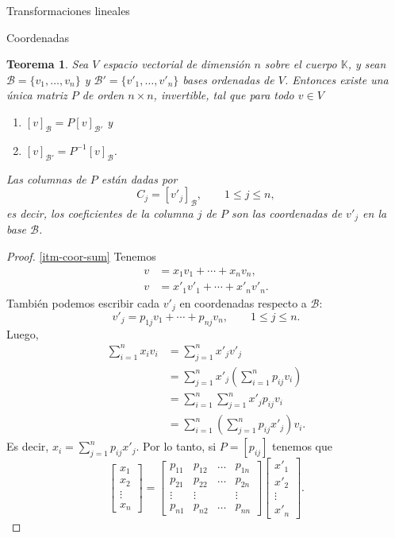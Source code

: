 \documentclass[a4paper,12pt,twoside,spanish,reqno]{amsbook}
\numberwithin{equation}{section}
\newtheorem{teorema}{Teorema}[section]
\theoremstyle{definition}
\theoremstyle{remark}
\newcommand{\K}{\mathbb K}
\begin{document}
\begin{chapter}{Transformaciones lineales}
\begin{section}{Coordenadas}
    \begin{teorema}
            Sea $V$  espacio vectorial de dimensión $n$  sobre el cuerpo $\K$, 	y sean $	\mathcal{B} = \{v_1,\ldots,v_n\}$ y $\mathcal{B'} = \{v'_1,\ldots,v'_n\}$ bases ordenadas de $V$. Entonces existe una única matriz $P$ de orden $n \times n$, invertible, tal que para todo $v \in V$
            \begin{enumerate}
                \item\label{itm-coor-sum} $[v]_\mathcal{B} = P[v]_\mathcal{B'}$ y
                \item\label{itm-coor-prod} $[v]_\mathcal{B'} = P^{-1}[v]_\mathcal{B}$.
            \end{enumerate} 
            Las columnas de $P$ están dadas por
            $$
            C_j = [v'_j]_\mathcal{B},\qquad 1 \le j \le n,
            $$
            es decir, los coeficientes de la columna $j$ de $P$ son las coordenadas de $v'_j$ en la base $\mathcal{B}$. 
    \end{teorema}
    \begin{proof} \ref{itm-coor-sum} Tenemos
        \begin{align*}
            v &=   x_1v_1 + \cdots +x_nv_n, \\
            v &=  x'_1v'_1 + \cdots +x'_nv'_n.
        \end{align*}
         También podemos escribir cada $v'_j$ en coordenadas respecto a $\mathcal B$:
         $$
         v'_j =  p_{1j}v_1 + \cdots +p_{nj}v_n, \qquad  1 \le j \le n.
         $$ 
        Luego, 
        \begin{align*}
             \sum_{i=1}^{n}x_iv_i &=  \sum_{j=1}^{n}x'_jv'_j \\
            &=  \sum_{j=1}^{n}x'_j(\sum_{i=1}^{n}p_{ij}v_i) \\
            &=  \sum_{i=1}^{n}\sum_{j=1}^{n}x'_jp_{ij}v_i \\
            &=  \sum_{i=1}^{n}(\sum_{j=1}^{n}p_{ij}x'_j)v_i.			
        \end{align*}
        Es decir, $x_i = \sum_{j=1}^{n}p_{ij}x'_j$. Por lo tanto, si $P = [p_{ij}]$ tenemos que
        $$
        \begin{bmatrix}x_1 \\ x_2\\ \vdots \\ x_n\end{bmatrix} = 
        \begin{bmatrix}p_{11} &p_{12} & \ldots & p_{1n} \\p_{21} &p_{22} & \ldots & p_{2n} \\ \vdots &\vdots && \vdots\\ p_{n1} &p_{n2} & \ldots & p_{nn}\end{bmatrix}
         \begin{bmatrix}x'_1 \\ x'_2\\ \vdots \\ x'_n\end{bmatrix}.
        $$
        

\end{proof}
\end{section}
\end{chapter}
\end{document}
